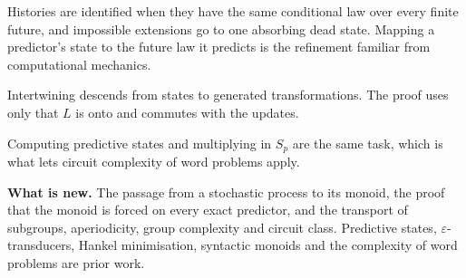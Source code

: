 \documentclass[11pt]{article}
\begin{document}
\begin{center}
\end{center}

\vspace{2mm}

\small
\begin{description}[leftmargin=1.6em,style=unboxed,itemsep=4pt]

\item[(1)--(3)] Histories are identified when they have the same
conditional law over every finite future, and impossible extensions go
to one absorbing dead state.  Mapping a predictor's state to the future
law it predicts is the refinement familiar from computational
mechanics.

\item[(4)] Intertwining descends from states to generated
transformations.  The proof uses only that $L$ is onto and commutes
with the updates.

\item[(5)] Computing predictive states and multiplying in $S_p$ are the
same task, which is what lets circuit complexity of word problems
apply.

\end{description}

\noindent\textbf{What is new.}
The passage from a stochastic process to its monoid, the proof that the
monoid is forced on every exact predictor, and the transport of
subgroups, aperiodicity, group complexity and circuit class.  Predictive
states, $\varepsilon$-transducers, Hankel minimisation, syntactic
monoids and the complexity of word problems are prior work.
\end{document}
